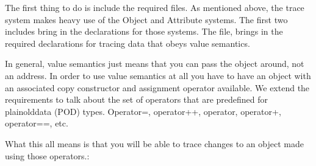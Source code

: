 \documentclass[letterpaper,10pt,english]{sphinxmanual}
\renewcommand{\sphinxcode}[1]{\texttt{\small{#1}}}
\begin{document}
\begin{sphinxVerbatim}[commandchars=\\\{\}]
 
 
 
 

 

  
\end{sphinxVerbatim}

The first thing to do is include the required files. As mentioned above, the
trace system makes heavy use of the Object and Attribute systems. The first two
includes bring in the declarations for those systems. The file,
\sphinxcode{} brings in the required declarations for tracing data that
obeys value semantics.

In general, value semantics just means that you can pass the object around, not
an address. In order to use value semantics at all you have to have an object
with an associated copy constructor and assignment operator available. We extend
the requirements to talk about the set of operators that are pre\sphinxhyphen{}defined for
plain\sphinxhyphen{}old\sphinxhyphen{}data (POD) types. Operator=, operator++, operator\textendash{}, operator+,
operator==, etc.

What this all means is that you will be able to trace changes to an object
made using those operators.:
\end{document}
